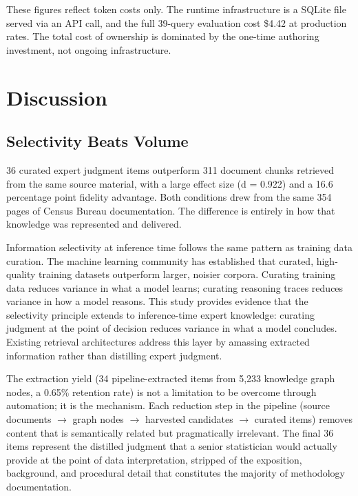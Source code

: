 \documentclass[
  11pt,
  letterpaper,
]{article}
\begin{document}
These figures reflect token costs only. The runtime infrastructure is a
SQLite file served via an API call, and the full 39-query evaluation
cost \$4.42 at production rates. The total cost of ownership is
dominated by the one-time authoring investment, not ongoing
infrastructure.

\section{Discussion}\label{discussion}

\subsection{Selectivity Beats Volume}\label{selectivity-beats-volume}

36 curated expert judgment items outperform 311 document chunks
retrieved from the same source material, with a large effect size (d =
0.922) and a 16.6 percentage point fidelity advantage. Both conditions
drew from the same 354 pages of Census Bureau documentation. The
difference is entirely in how that knowledge was represented and
delivered.

Information selectivity at inference time follows the same pattern as
training data curation. The machine learning community has established
that curated, high-quality training datasets outperform larger, noisier
corpora. Curating training data reduces variance in what a model learns;
curating reasoning traces reduces variance in how a model reasons. This
study provides evidence that the selectivity principle extends to
inference-time expert knowledge: curating judgment at the point of
decision reduces variance in what a model concludes. Existing retrieval
architectures address this layer by amassing extracted information
rather than distilling expert judgment.

The extraction yield (34 pipeline-extracted items from 5,233 knowledge
graph nodes, a 0.65\% retention rate) is not a limitation to be overcome
through automation; it is the mechanism. Each reduction step in the
pipeline (source documents \(\to\) graph nodes \(\to\) harvested
candidates \(\to\) curated items) removes content that is semantically
related but pragmatically irrelevant. The final 36 items represent the
distilled judgment that a senior statistician would actually provide at
the point of data interpretation, stripped of the exposition,
background, and procedural detail that constitutes the majority of
methodology documentation.
\end{document}
